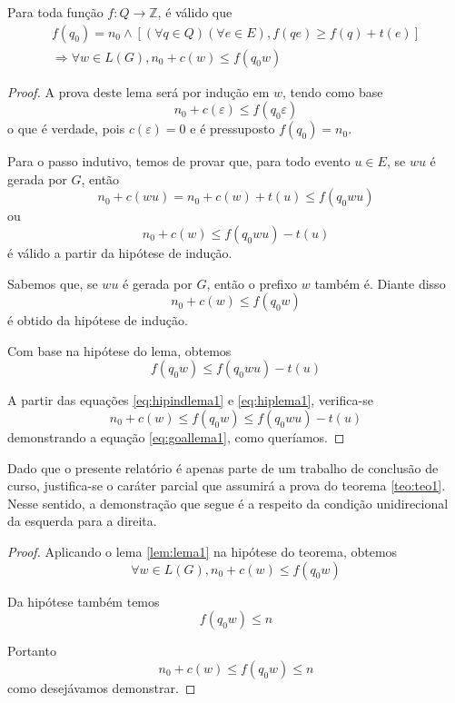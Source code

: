 \begin{lem}
	\label{lem:lema1}
	Para toda função $f : Q \to \mathbb{Z}$, é válido que\begin{equation*}
	\begin{aligned}
	f(q_0) = n_0 \wedge [(\forall q \in Q)(\forall e \in E), f(qe) \geq f(q) + t(e)]\\\Rightarrow \forall w \in L(G), n_0 + c(w) \leq f(q_0w)
	\end{aligned}
	\end{equation*}
\end{lem}
\begin{proof}
A prova deste lema será por indução em $w$, tendo como base $$n_0 + c(\varepsilon) \leq f(q_0\varepsilon)$$ o que é verdade, pois $c(\varepsilon) = 0$ e é pressuposto $f(q_0) = n_0$.

Para o passo indutivo, temos de provar que, para todo evento $u \in E$, se $ wu$ é gerada por $G$, então $$n_0 + c(wu) = n_0 + c(w) + t(u) \leq f(q_0wu)$$ ou \begin{equation}
\label{eq:goallema1}
n_0 + c(w) \leq f(q_0wu) - t(u)
\end{equation} é válido a partir da hipótese de indução.

Sabemos que, se $wu$ é gerada por $G$, então o prefixo $w$ também é. Diante disso \begin{equation}
\label{eq:hipindlema1}
n_0 + c(w) \leq f(q_0w)
\end{equation} é obtido da hipótese de indução.

Com base na hipótese do lema, obtemos \begin{equation}
\label{eq:hiplema1}
f(q_0w) \leq f(q_0wu) - t(u)
\end{equation}

A partir das equações \ref{eq:hipindlema1} e \ref{eq:hiplema1}, verifica-se $$n_0 + c(w) \leq f(q_0w) \leq f(q_0wu) - t(u)$$ demonstrando a equação \ref{eq:goallema1}, como queríamos.
\end{proof}

Dado que o presente relatório é apenas parte de um trabalho de conclusão de curso, justifica-se o caráter parcial que assumirá a prova do teorema \ref{teo:teo1}. Nesse sentido, a demonstração que segue é a respeito da condição unidirecional da esquerda para a direita.

\begin{proof}
Aplicando o lema \ref{lem:lema1} na hipótese do teorema, obtemos $$\forall w \in L(G), n_0 + c(w) \leq f(q_0w)$$

Da hipótese também temos $$f(q_0w) \leq n$$

Portanto $$n_0 + c(w) \leq f(q_0w) \leq n$$ como desejávamos demonstrar.
\end{proof}

